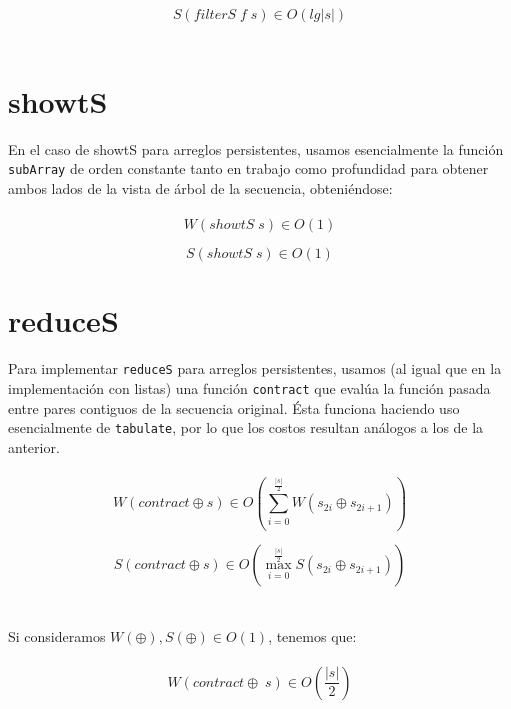 \documentclass[a4paper,10pt]{article}
\begin{document}
		\begin{equation*}
			S \left( filterS \;f \;s \right) \in O \left( lg\vert s \vert \right)
		\end{equation*}
\\

	\section*{\Large showtS}
		En el caso de showtS para arreglos persistentes, usamos esencialmente la función \texttt{subArray} de orden constante tanto en trabajo como profundidad para obtener ambos lados de la vista de árbol de la secuencia, obteniéndose:
\\
\\
		\begin{equation*}
			W\left( showtS \; s \right) \in O\left( 1 \right)
		\end{equation*}		
		
		\begin{equation*}
			S\left( showtS \; s \right) \in O\left( 1 \right)
		\end{equation*}	

\pagebreak
	\section*{\Large reduceS}
		Para implementar \texttt{reduceS} para arreglos persistentes, usamos (al igual que en la implementación con listas) una función \texttt{contract} que evalúa la función pasada entre pares contiguos de la secuencia original. Ésta funciona haciendo uso esencialmente de \texttt{tabulate}, por lo que los costos resultan análogos a los de la anterior.
\\
\\
		\begin{equation*}
			W \left( contract \oplus s \right) \in O \left( \sum_{i=0}^{\frac{\vert s \vert}{2}} W \left( s_{2i} \oplus s_{2i+1} \right) \right)
		\end{equation*}

		\begin{equation*}
		S \left( contract \oplus s \right) \in O \left( \max_{i=0}^{\frac{\vert s \vert}{2}} S \left( s_{2i} \oplus s_{2i+1} \right) \right)
		\end{equation*}
\\
\\
		Si consideramos $W(\oplus), S(\oplus) \in O(1)$, tenemos que:
\\
\\		
		\begin{equation*}
			W \left( contract \oplus \; s \right) \in O \left( \frac{\vert s \vert}{2} \right)
		\end{equation*}
		
\end{document}
